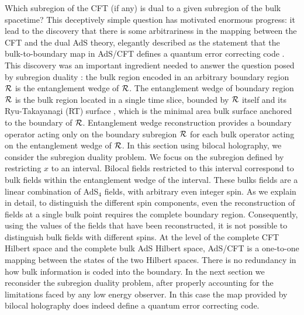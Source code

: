 \documentclass[a4paper,12pt]{article}
\begin{document}
Which subregion of the CFT (if any) is dual to a given subregion of the bulk spacetime?
This deceptively simple question has motivated enormous progress: it lead to the discovery that there is some arbitrariness in 
the mapping between the CFT and the dual AdS theory, elegantly described as the statement that the bulk-to-boundary map 
in AdS/CFT defines a quantum error correcting code \cite{Almheiri:2014lwa,Pastawski:2015qua,Harlow:2016vwg}. 
This discovery was an important ingredient needed to answer the question posed by subregion 
duality \cite{Dong:2016eik,Cotler:2017erl,Faulkner:2017vdd,Chen:2019gbt}: the bulk region encoded
in an arbitrary boundary region ${\cal R}$ is the entanglement wedge of ${\cal R}$\cite{Hubeny:2007xt}. 
The entanglement wedge of boundary region ${\cal R}$ is the bulk region located in a single time slice, bounded by
${\cal R}$ itself and its Ryu-Takayanagi (RT) surface \cite{Ryu:2006bv,Ryu:2006ef}, which is the minimal area bulk 
surface anchored to the boundary of ${\cal R}$. 
Entanglement wedge reconstruction\cite{Dong:2016eik,Cotler:2017erl,Faulkner:2017vdd,Chen:2019gbt,Czech:2012bh,Headrick:2014cta,Wall:2012uf,Jafferis:2015del,Hayden:2018khn} provides a boundary operator acting only on the boundary subregion 
${\cal R}$ for each bulk operator acting on the entanglement wedge of ${\cal R}$. 
In this section using bilocal holography, we consider the subregion duality problem.
We focus on the subregion defined by restricting $x$ to an interval.
Bilocal fields restricted to this interval correspond to bulk fields within the entanglement wedge of the interval.  
These bulks fields are a linear combination of AdS$_4$ fields, with arbitrary even integer spin.
As we explain in detail, to distinguish the different spin components, even the reconstruction of fields at a single bulk 
point requires the complete boundary region.
Consequently, using the values of the fields that have been reconstructed, it is not possible to distinguish bulk fields with 
different spins.
At the level of the complete CFT Hilbert space and the complete bulk AdS Hilbert space, AdS/CFT is a one-to-one
mapping between the states of the two Hilbert spaces.
There is no redundancy in how bulk information is coded into the boundary.
In the next section we reconsider the subregion duality problem, after properly accounting for the
limitations faced by any low energy observer.
In this case the map provided by bilocal holography does indeed define a quantum error correcting code.
\end{document}
